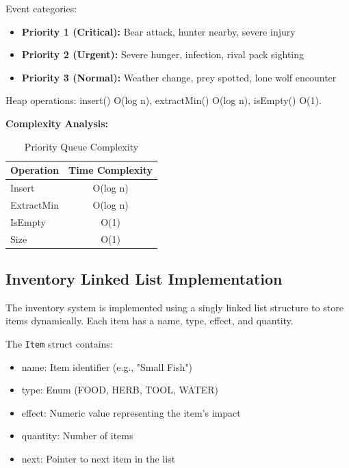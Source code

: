 \documentclass[12pt,a4paper]{article}
\begin{document}
Event categories:
\begin{itemize}
	\item \textbf{Priority 1 (Critical):} Bear attack, hunter nearby, severe injury
	\item \textbf{Priority 2 (Urgent):} Severe hunger, infection, rival pack sighting
	\item \textbf{Priority 3 (Normal):} Weather change, prey spotted, lone wolf encounter
\end{itemize}

Heap operations: insert() O(log n), extractMin() O(log n), isEmpty() O(1).

\textbf{Complexity Analysis:}
\begin{table}[h]
	\centering
	\caption{Priority Queue Complexity}
	\begin{tabular}{@{}lc@{}}
		\toprule
		\textbf{Operation} & \textbf{Time Complexity} \\ \midrule
		Insert             & O(log n)                 \\
		ExtractMin         & O(log n)                 \\
		IsEmpty            & O(1)                     \\
		Size               & O(1)                     \\
		\bottomrule
	\end{tabular}
\end{table}

\subsection{Inventory Linked List Implementation}
The inventory system is implemented using a singly linked list structure to store items dynamically. Each item has a name, type, effect, and quantity.

The \texttt{Item} struct contains:
\begin{itemize}
	\item name: Item identifier (e.g., "Small Fish")
	\item type: Enum (FOOD, HERB, TOOL, WATER)
	\item effect: Numeric value representing the item's impact
	\item quantity: Number of items
	\item next: Pointer to next item in the list
\end{itemize}
\end{document}
